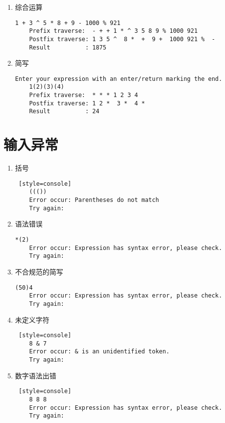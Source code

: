 \begin{enumerate}
    \item 综合运算
\begin{lstlisting}[style=console]
    1 + 3 ^ 5 * 8 + 9 - 1000 % 921
    Prefix traverse:  - + + 1 * ^ 3 5 8 9 % 1000 921
    Postfix traverse: 1 3 5 ^  8 *  +  9 +  1000 921 %  - 
    Result          : 1875
\end{lstlisting}

    \item 简写
\begin{lstlisting}[style=console]
    Enter your expression with an enter/return marking the end.
    1(2)(3)(4)
    Prefix traverse:  * * * 1 2 3 4
    Postfix traverse: 1 2 *  3 *  4 * 
    Result          : 24
\end{lstlisting}

\end{enumerate}


\section{输入异常}

\begin{enumerate}
    \item 括号
\begin{lstlisting} [style=console]
    ((())
    Error occur: Parentheses do not match
    Try again: 
\end{lstlisting}

    \item 语法错误
\begin{lstlisting}[style=console]
    *(2)
    Error occur: Expression has syntax error, please check.
    Try again: 
\end{lstlisting}

    \item 不合规范的简写
\begin{lstlisting}[style=console]
    (50)4
    Error occur: Expression has syntax error, please check.
    Try again: 
\end{lstlisting}

    \item 未定义字符
\begin{lstlisting} [style=console]
    8 & 7
    Error occur: & is an unidentified token.
    Try again: 
\end{lstlisting}

    \item 数字语法出错
\begin{lstlisting} [style=console]
    8 8 8
    Error occur: Expression has syntax error, please check.
    Try again: 
\end{lstlisting}
\end{enumerate}